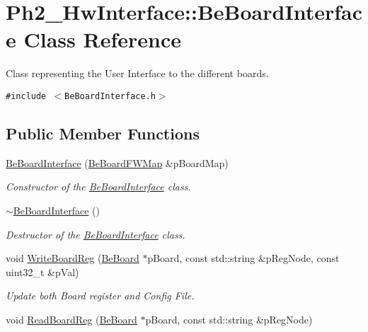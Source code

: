 \hypertarget{class_ph2___hw_interface_1_1_be_board_interface}{
\section{Ph2\_\-Hw\-Interface::Be\-Board\-Interface Class Reference}
\label{class_ph2___hw_interface_1_1_be_board_interface}
}
Class representing the User Interface to the different boards.  


{\tt \#include $<$Be\-Board\-Interface.h$>$}

\subsection*{Public Member Functions}
\begin{CompactItemize}
\item 
\hyperlink{class_ph2___hw_interface_1_1_be_board_interface_621bd484157724e03eeba5d52ce0b726}{Be\-Board\-Interface} (\hyperlink{namespace_ph2___hw_interface_59fe3165f25ded62b5b12cf0ebc69e8d}{Be\-Board\-FWMap} \&p\-Board\-Map)
\begin{CompactList}\small\item\em Constructor of the \hyperlink{class_ph2___hw_interface_1_1_be_board_interface}{Be\-Board\-Interface} class. \item\end{CompactList}\item 
\hyperlink{class_ph2___hw_interface_1_1_be_board_interface_d67b2d931b904565cf6e5881fa0d140e}{$\sim$Be\-Board\-Interface} ()
\begin{CompactList}\small\item\em Destructor of the \hyperlink{class_ph2___hw_interface_1_1_be_board_interface}{Be\-Board\-Interface} class. \item\end{CompactList}\item 
void \hyperlink{class_ph2___hw_interface_1_1_be_board_interface_dd92a5f30e058c3a384b8fde1015f31a}{Write\-Board\-Reg} (\hyperlink{class_ph2___hw_description_1_1_be_board}{Be\-Board} $\ast$p\-Board, const std::string \&p\-Reg\-Node, const uint32\_\-t \&p\-Val)
\begin{CompactList}\small\item\em Update both Board register and Config File. \item\end{CompactList}\item 
void \hyperlink{class_ph2___hw_interface_1_1_be_board_interface_1b3096f0b052d6e9329fdb3b9a8299fb}{Read\-Board\-Reg} (\hyperlink{class_ph2___hw_description_1_1_be_board}{Be\-Board} $\ast$p\-Board, const std::string \&p\-Reg\-Node)

\end{CompactItemize}
